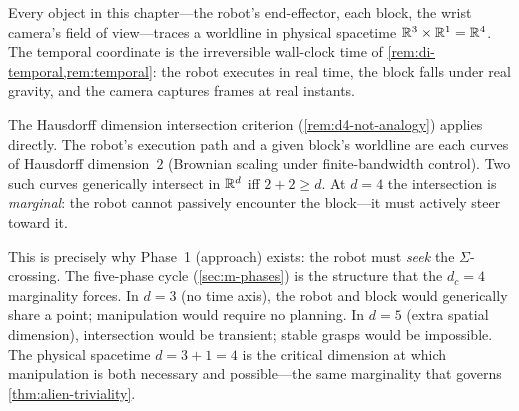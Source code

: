 \begin{remark}[Why the ambient dimension is $d = 4$]
\label{rem:m-d4}
Every object in this chapter---the robot's end-effector, each
block, the wrist camera's field of view---traces a worldline in
physical spacetime $\mathbb{R}^3 \times \mathbb{R}^1 = \mathbb{R}^4$.  The temporal
coordinate is the irreversible wall-clock time of
\cref{rem:di-temporal,rem:temporal}: the robot executes in
real time, the block falls under real gravity, and the camera
captures frames at real instants.

The Hausdorff dimension intersection criterion
(\cref{rem:d4-not-analogy}) applies directly.  The robot's
execution path and a given block's worldline are each curves of
Hausdorff dimension~$2$ (Brownian scaling under finite-bandwidth
control).  Two such curves generically intersect in $\mathbb{R}^d$ iff
$2 + 2 \geq d$.  At $d = 4$ the intersection is \emph{marginal}:
the robot cannot passively encounter the block---it must actively
steer toward it.

This is precisely why Phase~1 (approach) exists: the robot must
\emph{seek} the $\Sigma$-crossing.  The five-phase cycle
(\cref{sec:m-phases}) is the structure that the
$d_c = 4$ marginality forces.  In $d = 3$ (no time axis), the
robot and block would generically share a point; manipulation
would require no planning.  In $d = 5$ (extra spatial dimension),
intersection would be transient; stable grasps would be
impossible.  The physical spacetime $d = 3 + 1 = 4$ is the
critical dimension at which manipulation is both necessary and
possible---the same marginality that governs
\cref{thm:alien-triviality}.
\end{remark}

